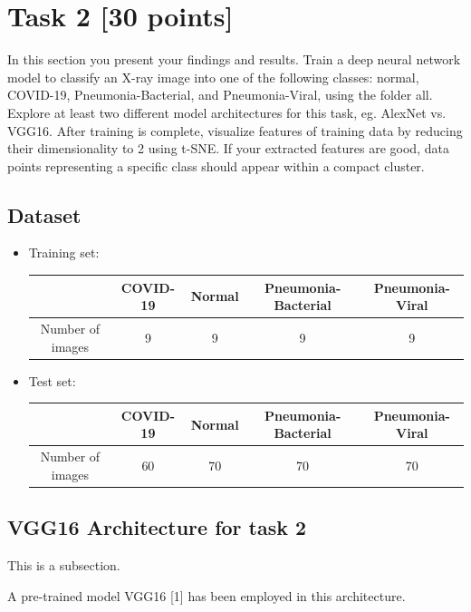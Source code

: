 \documentclass[a4paper,10pt]{article}
\begin{document}
\section{Task 2 [30 points]}
In this section you present your findings and results.
Train a deep neural network model to classify an X-ray image into one of the following classes: 
normal, COVID-19, Pneumonia-Bacterial, and Pneumonia-Viral, 
using the folder all. 
Explore at least two different model architectures for this task, eg. AlexNet vs. VGG16. 
After training is complete, visualize features of training data by reducing their dimensionality to 2 using t-SNE. 
If your extracted features are good, data points representing a specific class should appear within a compact cluster. 

\subsection{Dataset}

\begin{itemize}
  \item Training set: \\
   \begin{tabular}{ |c|c|c|c|c| }
    \hline
     & COVID-19 & Normal &  Pneumonia-Bacterial & Pneumonia-Viral\\
    \hline
    Number of images   & 9 & 9 & 9 & 9 \\
    \hline 
  \end{tabular}

  \item Test set: \\
  \begin{tabular}{ |c|c|c|c|c| }
    \hline
     & COVID-19 & Normal &  Pneumonia-Bacterial & Pneumonia-Viral\\
    \hline
    Number of images   & 60 & 70 & 70 & 70 \\
    \hline
  
  \end{tabular}
\end{itemize}


\subsection{VGG16 Architecture for task 2}
This is a subsection.

A pre-trained model VGG16 [1] has been employed in this architecture. \\
\end{document}

